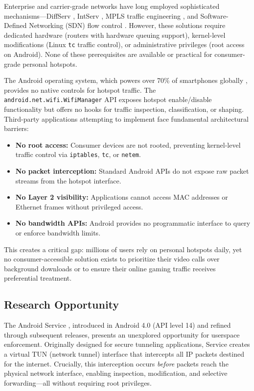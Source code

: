 Enterprise and carrier-grade networks have long employed sophisticated \qos mechanisms—DiffServ \cite{rfc2475}, IntServ \cite{rfc2205}, MPLS traffic engineering \cite{rfc3031}, and Software-Defined Networking (SDN) flow control \cite{mckeown2008openflow}. However, these solutions require dedicated hardware (routers with hardware queuing support), kernel-level modifications (Linux \texttt{tc} traffic control), or administrative privileges (root access on Android). None of these prerequisites are available or practical for consumer-grade personal hotspots.

The Android operating system, which powers over 70\% of smartphones globally \cite{statcounter2024}, provides no native \qos controls for hotspot traffic. The \texttt{android.net.wifi.WifiManager} API exposes hotspot enable/disable functionality but offers no hooks for traffic inspection, classification, or shaping. Third-party applications attempting to implement \qos face fundamental architectural barriers:

\begin{itemize}[leftmargin=*]
    \item \textbf{No root access:} Consumer devices are not rooted, preventing kernel-level traffic control via \texttt{iptables}, \texttt{tc}, or \texttt{netem}.
    \item \textbf{No packet interception:} Standard Android APIs do not expose raw packet streams from the hotspot interface.
    \item \textbf{No Layer 2 visibility:} Applications cannot access MAC addresses or Ethernet frames without privileged access.
    \item \textbf{No bandwidth APIs:} Android provides no programmatic interface to query or enforce bandwidth limits.
\end{itemize}

This creates a critical gap: millions of users rely on personal hotspots daily, yet no consumer-accessible solution exists to prioritize their video calls over background downloads or to ensure their online gaming traffic receives preferential treatment.

\subsection{Research Opportunity}

The Android \vpn Service \api, introduced in Android 4.0 (API level 14) and refined through subsequent releases, presents an unexplored opportunity for userspace \qos enforcement. Originally designed for secure tunneling applications, \vpn Service creates a virtual TUN (network tunnel) interface that intercepts all IP packets destined for the internet. Crucially, this interception occurs \emph{before} packets reach the physical network interface, enabling inspection, modification, and selective forwarding—all without requiring root privileges.

